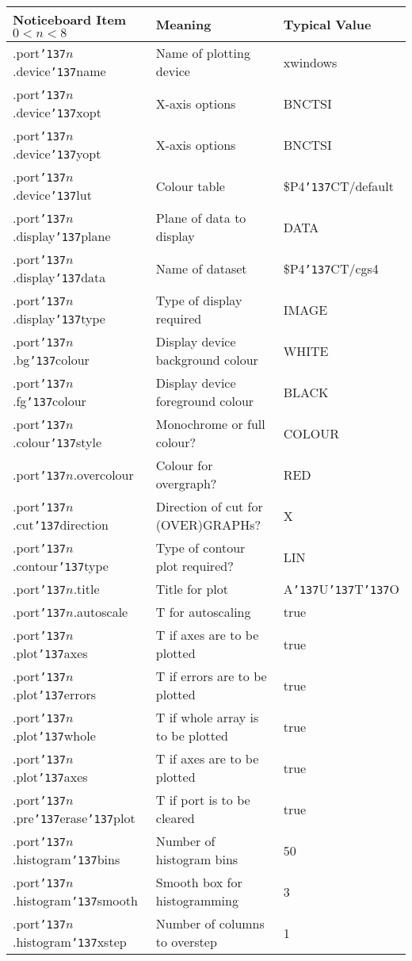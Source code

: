 \documentclass[a4paper]{book}
\renewcommand{\_}{{\tt\char'137}}
\begin{document}
\begin{table}
\begin{center}
\begin{tabular}{||l|l|l||}
\hline
Noticeboard Item\footnotemark[2] $0<n<8$ & Meaning & Typical Value \\
\hline
.port\_$n$.device\_name & Name of plotting device & xwindows \\
.port\_$n$.device\_xopt & X-axis options & BNCTSI \\
.port\_$n$.device\_yopt & X-axis options & BNCTSI \\
.port\_$n$.device\_lut & Colour table & \$P4\_CT/default \\
.port\_$n$.display\_plane & Plane of data to display & DATA \\
.port\_$n$.display\_data & Name of dataset & \$P4\_CT/cgs4 \\
.port\_$n$.display\_type & Type of display required & IMAGE \\
.port\_$n$.bg\_colour & Display device background colour & WHITE \\
.port\_$n$.fg\_colour & Display device foreground colour & BLACK \\
.port\_$n$.colour\_style & Monochrome or full colour?  & COLOUR \\
.port\_$n$.overcolour & Colour for overgraph? & RED \\
.port\_$n$.cut\_direction & Direction of cut for (OVER)GRAPHs? & X \\
.port\_$n$.contour\_type & Type of contour plot required? & LIN \\
.port\_$n$.title & Title for plot & A\_U\_T\_O \\
.port\_$n$.autoscale & T for autoscaling & {\sc true} \\
.port\_$n$.plot\_axes & T if axes are to be plotted & {\sc true} \\
.port\_$n$.plot\_errors & T if errors are to be plotted & {\sc true} \\
.port\_$n$.plot\_whole & T if whole array is to be plotted & {\sc true} \\
.port\_$n$.plot\_axes & T if axes are to be plotted & {\sc true} \\
.port\_$n$.pre\_erase\_plot & T if port is to be cleared & {\sc true} \\
.port\_$n$.histogram\_bins & Number of histogram bins & 50 \\
.port\_$n$.histogram\_smooth & Smooth box for histogramming & 3 \\
.port\_$n$.histogram\_xstep & Number of columns to overstep & 1 \\

\end{tabular}
\end{center}
\end{table}
\end{document}

